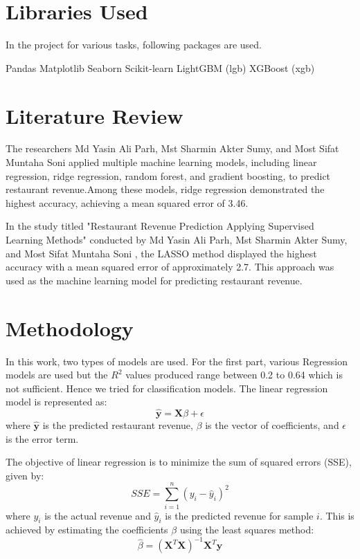 \documentclass{josis}
\begin{document}
\section{Libraries Used}
In the project for various tasks, following packages are used.
\begin{python}
Pandas
Matplotlib
Seaborn
Scikit-learn
LightGBM (lgb)
XGBoost (xgb)
\end{python}
\section{Literature Review}
The researchers Md Yasin Ali Parh, Mst Sharmin Akter Sumy, and Most Sifat Muntaha Soni 
\cite{redy2021restaurant,redy2023restaurant,ismail2023predicting,shah2016restaurant} applied multiple machine learning models, including linear regression, ridge regression, random forest, and gradient boosting, to predict restaurant revenue.Among these models, ridge regression demonstrated the highest accuracy, achieving a mean squared error of 3.46.

In the study titled "Restaurant Revenue Prediction Applying Supervised
Learning Methods" conducted by Md Yasin Ali Parh, Mst Sharmin Akter Sumy, and Most Sifat Muntaha Soni \cite{ismail2023predicting}, the LASSO method displayed the highest accuracy with a mean squared error of approximately 2.7. This approach was used as the machine learning model for predicting restaurant revenue.
\section{Methodology}
In this work, two types of models are used. For the first part, various Regression models are used but the $R^2$ values produced range between 0.2 to 0.64 which is not sufficient. Hence we tried for classification models.
The linear regression model is represented as:
\begin{equation}
         \hat{\mathbf{y}} = \mathbf{X}\beta + \epsilon
\end{equation}
where $\hat{\mathbf{y}}$ is the predicted restaurant revenue, $\beta$ is the vector of coefficients, and $\epsilon$ is the error term.

The objective of linear regression is to minimize the sum of squared errors (SSE), given by:
\begin{equation*}
    SSE = \sum_{i=1}^{n} (y_i - \hat{y}_i)^2
\end{equation*}
where $y_i$ is the actual revenue and $\hat{y}_i$ is the predicted revenue for sample $i$. This is achieved by estimating the coefficients $\beta$ using the least squares method:
\begin{equation*}
    \hat{\beta} = (\mathbf{X}^T\mathbf{X})^{-1}\mathbf{X}^T\mathbf{y}
\end{equation*}
\end{document}

